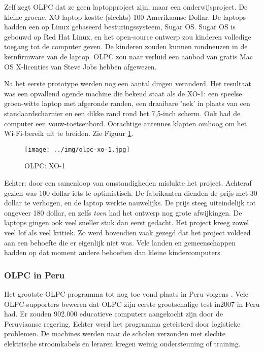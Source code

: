 Zelf zegt OLPC dat ze geen laptopproject zijn, maar een onderwijsproject. De kleine groene, XO-laptop kostte (slechts) 100 Amerikaanse Dollar. De laptops hadden een op Linux gebaseerd besturingssysteem, Sugar OS. Sugar OS is gebouwd op Red Hat Linux, en het open-source ontwerp zou kinderen volledige toegang tot de computer geven. De kinderen zouden kunnen rondneuzen in de kernfirmware van de laptop. OLPC zou naar verluid een aanbod van gratis Mac OS X-licenties van Steve Jobs hebben afgewezen. \autocite{Robertson2018}

Na het eerste prototype werden nog een aantal dingen veranderd. Het resultaat was een opvallend ogende machine die bekend staat als de XO-1: een speelse groen-witte laptop met afgeronde randen, een draaibare 'nek' in plaats van een standaardscharnier en een dikke rand rond het 7,5-inch scherm. Ook had de computer een vouw-toetsenbord. Oorachtige antennes klapten omhoog om het Wi-Fi-bereik uit te breiden. Zie Figuur \ref{xo-1}. \autocite{Robertson2018}

 \begin{figure}[h!]
	\texttt{[image: ../img/olpc-xo-1.jpg]}
	\caption{OLPC: XO-1}
	\label{xo-1}
\end{figure}

Echter: door een samenloop van omstandigheden mislukte het project. Achteraf gezien was 100 dollar iets te optimistisch. De fabrikanten dienden de prijs met 30 dollar te verhogen, en de laptop werkte nauwelijks. De prijs steeg uiteindelijk tot ongeveer 180 dollar, en zelfs \textit{toen} had het ontwerp nog grote afwijkingen. De laptops gingen ook veel sneller stuk dan eerst gedacht. Het project kreeg zowel veel lof als veel kritiek. Zo werd bovendien vaak gezegd dat het project voldeed aan een behoefte die er eigenlijk niet was. Vele landen en gemeenschappen hadden op dat moment andere behoeften dan kleine kindercomputers. \autocite{Robertson2018}

\subsubsection{OLPC in Peru}
Het grootste OLPC-programma tot nog toe vond plaats in Peru volgens \autocite{Trucano2012}. Vele OLPC-supporters beweren dat OLPC zijn eerste grootschalige test in2007 in Peru had. Er zouden 902.000 educatieve computers aangekocht zijn door de Peruviaanse regering. Echter werd het programma geteisterd door logistieke problemen. De machines werden naar de scholen verzonden met slechte elektrische stroomkabels en leraren kregen weinig ondersteuning of training. \autocite{Robertson2018}

